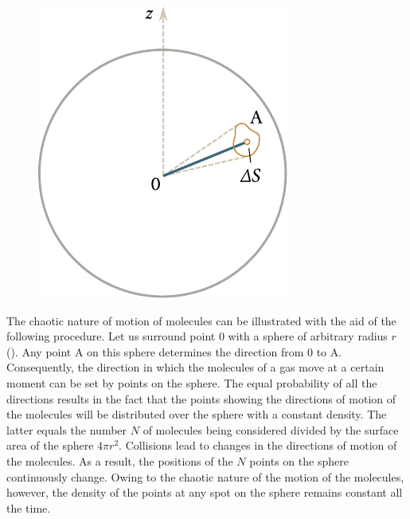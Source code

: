 \begin{figure}[t]
	\begin{center}
		\includegraphics[scale=0.95]{figures/ch_11/fig_11_2.pdf}
		\caption[]{}
		\label{fig:11_2}
	\end{center}
	\vspace{-0.8cm}
\end{figure}

The chaotic nature of motion of molecules can be illustrated with the aid of the following procedure. Let us surround point $0$ with a sphere of arbitrary radius $r$ (). Any point A on this sphere determines the direction from $0$ to A. Consequently, the direction in which the molecules of a gas move at a certain moment can be set by points on the sphere. The equal probability of all the directions results in the fact that the points showing the directions of motion of the molecules will be distributed over the sphere with a constant density. The latter equals the number $N$ of molecules being considered divided by the surface area of the sphere $4\pi r^2$. Collisions lead to changes in the directions of motion of the molecules. As a result, the positions of the $N$ points on the sphere continuously change. Owing to the chaotic nature of the motion of the molecules, however, the density of the points at any spot on the sphere remains constant all the time.

